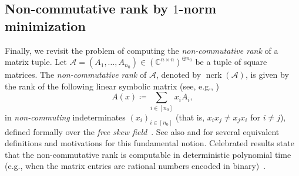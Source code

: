 \documentclass[11pt,letterpaper]{article}
\numberwithin{equation}{section}
\newcommand{\op}{\oplus}
\newcommand{\CC}{\mathbb{C}}
\DeclareMathOperator{\ncrk}{ncrk}
\begin{document}
\subsection{Non-commutative rank by \texorpdfstring{$1$}{1}-norm minimization}\label{sub:ncrk}
Finally, we revisit the problem of computing the \emph{non-commutative rank} of a matrix tuple.
Let $\mathcal{A} = (A_1, \ldots, A_{n_0}) \in (\CC^{n \times n})^{\op n_0}$ be a tuple of square matrices.
The \emph{non-commutative rank} of $\mathcal{A}$, denoted by $\ncrk(\mathcal{A})$, is given by the rank of the following linear symbolic matrix (see, e.g., \cite{Fortin-Rautenauer-04})
\[
    A(x) \coloneqq \sum_{i \in [n_0]}x_iA_i,
\]
in \emph{non-commuting} indeterminates $(x_i)_{i \in [n_0]}$ (that is, $x_ix_j \neq x_jx_i$ for $i\neq j$), defined formally over the \emph{free skew field}~\cite{Cohn1995}.
See also \cite[Thm.~1.17]{GGOW20} and \cite[Def.~2.1]{FSG-22} for several equivalent definitions and motivations for this fundamental notion.
Celebrated results state that the non-commutative rank is computable in deterministic polynomial time (e.g., when the matrix entries are rational numbers encoded in binary)~\cite{GGOW20,IQS-18,Hamada-Hirai-21}.
\end{document}
